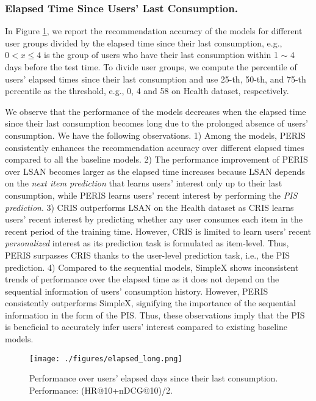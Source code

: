\documentclass[sigconf]{acmart}
\newcommand{\MD}{{\small\textsf{PERIS}}}
\begin{document}
\subsubsection{\textbf{Elapsed Time Since Users' Last Consumption.}}
 In Figure \ref{fig:elap}, we report the recommendation accuracy of the models for different user groups divided by the elapsed time since their last consumption, e.g., $0 < x \le 4$ is the group of users who have their last consumption within 1 $\sim$ 4 days before the test time. To divide user groups, we compute the percentile of users' elapsed times since their last consumption and use 25-th, 50-th, and 75-th percentile as the threshold, e.g., 0, 4 and 58 on Health dataset, respectively. 
 
We observe that the performance of the models decreases when the elapsed time since their last consumption becomes long due to the prolonged absence of users' consumption. We have the following observations. 
1) Among the models, \MD{} consistently enhances the recommendation accuracy over different elapsed times compared to all the baseline models. 
2) The performance improvement of \MD{} over LSAN becomes larger as the elapsed time increases because LSAN depends on the \textit{next item prediction} that learns users' interest only up to their last consumption, while \MD{} learns users' recent interest by performing the \textit{PIS prediction}.
3) CRIS outperforms LSAN on the Health dataset as CRIS learns users' recent interest by predicting whether any user consumes each item in the recent period of the training time. 
However, CRIS is limited to learn users' recent \textit{personalized} interest as its prediction task is formulated as item-level. Thus, \MD{} surpasses CRIS thanks to the user-level prediction task, i.e., the PIS prediction. 
4) Compared to the sequential models, SimpleX shows inconsistent trends of performance over the elapsed time as it does not depend on the sequential information of users' consumption history.
However, \MD{} consistently outperforms SimpleX, signifying the importance of the sequential information in the form of the PIS. 
Thus, these observations imply that the PIS is beneficial to accurately infer users' interest compared to existing baseline models.

\begin{figure}[t]
	\centering
	\texttt{[image: ./figures/elapsed\_long.png]}
	\caption{Performance over users' elapsed days since their last consumption. Performance: (HR@10+nDCG@10)/2.}
	\label{fig:elap}
\end{figure}
\end{document}
